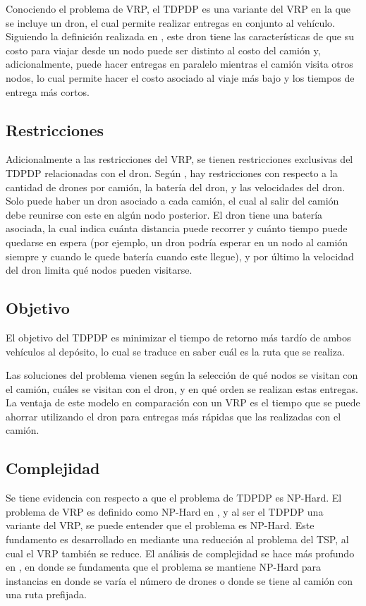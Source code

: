 Conociendo el problema de VRP, el TDPDP es una variante del VRP en la que se incluye un dron, el cual permite realizar entregas en conjunto al vehículo. Siguiendo la definición realizada en \cite{Murray2015Flying}, este dron tiene las características de que su costo para viajar desde un nodo puede ser distinto al costo del camión y, adicionalmente, puede hacer entregas en paralelo mientras el camión visita otros nodos, lo cual permite hacer el costo asociado al viaje más bajo y los tiempos de entrega más cortos. 


\subsection{Restricciones}

Adicionalmente a las restricciones del VRP, se tienen restricciones exclusivas del TDPDP relacionadas con el dron. Según \cite{Murray2015Flying}, hay restricciones con respecto a la cantidad de drones por camión, la batería del dron, y las velocidades del dron. Solo puede haber un dron asociado a cada camión, el cual al salir del camión debe reunirse con este en algún nodo posterior. El dron tiene una batería asociada, la cual indica cuánta distancia puede recorrer y cuánto tiempo puede quedarse en espera (por ejemplo, un dron podría esperar en un nodo al camión siempre y cuando le quede batería cuando este llegue), y por último la velocidad del dron limita qué nodos pueden visitarse.

\subsection{Objetivo}

El objetivo del TDPDP es minimizar el tiempo de retorno más tardío de ambos vehículos al depósito, lo cual se traduce en saber cuál es la ruta que se realiza. 

Las soluciones del problema vienen según la selección de qué nodos se visitan con el camión, cuáles se visitan con el dron, y en qué orden se realizan estas entregas. La ventaja de este modelo en comparación con un VRP es el tiempo que se puede ahorrar utilizando el dron para entregas más rápidas que las realizadas con el camión.

\subsection{Complejidad}

Se tiene evidencia con respecto a que el problema de TDPDP es NP-Hard. El problema de VRP es definido como NP-Hard en \cite{Irnich2014FamilyVRP}, y al ser el TDPDP una variante del VRP, se puede entender que el problema es NP-Hard. Este fundamento es desarrollado en \cite{ponza2016optimization} mediante una reducción al problema del TSP, al cual el VRP también se reduce. El análisis de complejidad se hace más profundo en \cite{boysen2018drone}, en donde se fundamenta que el problema se mantiene NP-Hard para instancias en donde se varía el número de drones o donde se tiene al camión con una ruta prefijada.

